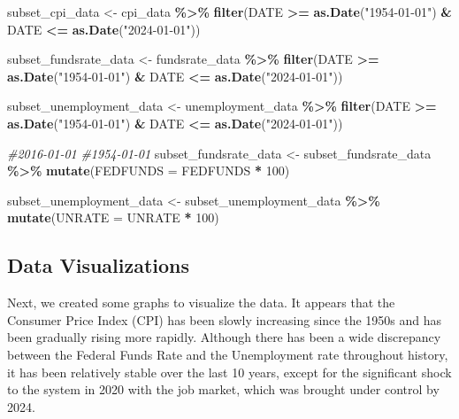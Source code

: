 \documentclass[
]{article}
\newenvironment{Shaded}{\begin{snugshade}}{\end{snugshade}}
\newcommand{\AttributeTok}[1]{\textcolor[rgb]{0.13,0.29,0.53}{#1}}
\newcommand{\CommentTok}[1]{\textcolor[rgb]{0.56,0.35,0.01}{\textit{#1}}}
\newcommand{\DecValTok}[1]{\textcolor[rgb]{0.00,0.00,0.81}{#1}}
\newcommand{\FunctionTok}[1]{\textcolor[rgb]{0.13,0.29,0.53}{\textbf{#1}}}
\newcommand{\NormalTok}[1]{#1}
\newcommand{\OtherTok}[1]{\textcolor[rgb]{0.56,0.35,0.01}{#1}}
\newcommand{\SpecialCharTok}[1]{\textcolor[rgb]{0.81,0.36,0.00}{\textbf{#1}}}
\newcommand{\StringTok}[1]{\textcolor[rgb]{0.31,0.60,0.02}{#1}}
\begin{document}
\begin{Shaded}
\begin{Highlighting}[]
\NormalTok{subset\_cpi\_data }\OtherTok{\textless{}{-}}\NormalTok{ cpi\_data }\SpecialCharTok{\%\textgreater{}\%}
    \FunctionTok{filter}\NormalTok{(DATE }\SpecialCharTok{\textgreater{}=} \FunctionTok{as.Date}\NormalTok{(}\StringTok{"1954{-}01{-}01"}\NormalTok{) }\SpecialCharTok{\&}\NormalTok{ DATE }\SpecialCharTok{\textless{}=} \FunctionTok{as.Date}\NormalTok{(}\StringTok{"2024{-}01{-}01"}\NormalTok{))}

\NormalTok{subset\_fundsrate\_data }\OtherTok{\textless{}{-}}\NormalTok{ fundsrate\_data }\SpecialCharTok{\%\textgreater{}\%}
    \FunctionTok{filter}\NormalTok{(DATE }\SpecialCharTok{\textgreater{}=} \FunctionTok{as.Date}\NormalTok{(}\StringTok{"1954{-}01{-}01"}\NormalTok{) }\SpecialCharTok{\&}\NormalTok{ DATE }\SpecialCharTok{\textless{}=} \FunctionTok{as.Date}\NormalTok{(}\StringTok{"2024{-}01{-}01"}\NormalTok{))}

\NormalTok{subset\_unemployment\_data }\OtherTok{\textless{}{-}}\NormalTok{ unemployment\_data }\SpecialCharTok{\%\textgreater{}\%}
    \FunctionTok{filter}\NormalTok{(DATE }\SpecialCharTok{\textgreater{}=} \FunctionTok{as.Date}\NormalTok{(}\StringTok{"1954{-}01{-}01"}\NormalTok{) }\SpecialCharTok{\&}\NormalTok{ DATE }\SpecialCharTok{\textless{}=} \FunctionTok{as.Date}\NormalTok{(}\StringTok{"2024{-}01{-}01"}\NormalTok{))}


\CommentTok{\#2016{-}01{-}01}
\CommentTok{\#1954{-}01{-}01}
\NormalTok{subset\_fundsrate\_data }\OtherTok{\textless{}{-}}\NormalTok{ subset\_fundsrate\_data }\SpecialCharTok{\%\textgreater{}\%}
  \FunctionTok{mutate}\NormalTok{(}\AttributeTok{FEDFUNDS =}\NormalTok{ FEDFUNDS }\SpecialCharTok{*} \DecValTok{100}\NormalTok{)}

\NormalTok{subset\_unemployment\_data }\OtherTok{\textless{}{-}}\NormalTok{ subset\_unemployment\_data }\SpecialCharTok{\%\textgreater{}\%}
  \FunctionTok{mutate}\NormalTok{(}\AttributeTok{UNRATE =}\NormalTok{ UNRATE }\SpecialCharTok{*} \DecValTok{100}\NormalTok{)}
\end{Highlighting}
\end{Shaded}

\subsection{Data Visualizations}\label{data-visualizations}

Next, we created some graphs to visualize the data. It appears that the
Consumer Price Index (CPI) has been slowly increasing since the 1950s
and has been gradually rising more rapidly. Although there has been a
wide discrepancy between the Federal Funds Rate and the Unemployment
rate throughout history, it has been relatively stable over the last 10
years, except for the significant shock to the system in 2020 with the
job market, which was brought under control by 2024.
\end{document}
